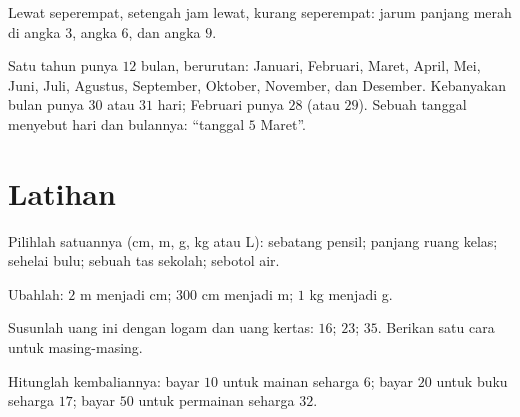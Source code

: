 \begin{omfigure}

{\small Lewat seperempat, setengah jam lewat, kurang seperempat:
jarum panjang merah di angka $3$, angka $6$, dan angka $9$.}
\end{omfigure}

\begin{example}[Kalender]\label{ex:g2:measure:calendar}
Satu tahun punya $12$ bulan, berurutan: Januari, Februari, Maret,
April, Mei, Juni, Juli, Agustus, September, Oktober, November, dan
Desember. Kebanyakan bulan punya $30$ atau $31$ hari; Februari punya
$28$ (atau $29$). Sebuah tanggal menyebut hari dan bulannya:
``tanggal $5$ Maret''.
\end{example}

\section{Latihan}

\begin{exercise}[$\star$]\label{exo:g2:measure:1}
Pilihlah satuannya (cm, m, g, kg atau L): sebatang pensil; panjang
ruang kelas; sehelai bulu; sebuah tas sekolah; sebotol air.
\end{exercise}

\begin{exercise}[$\star$]\label{exo:g2:measure:2}
Ubahlah: $2$ m menjadi cm; $300$ cm menjadi m; $1$ kg menjadi g.
\end{exercise}

\begin{exercise}[$\star$]\label{exo:g2:measure:3}
Susunlah  uang ini dengan logam dan uang kertas: $16$; \quad
$23$; \quad $35$. Berikan satu cara untuk masing-masing.
\end{exercise}

\begin{exercise}[$\star$]\label{exo:g2:measure:4}
Hitunglah kembaliannya: bayar $10$ untuk mainan seharga $6$; bayar
$20$ untuk buku seharga $17$; bayar $50$ untuk permainan seharga $32$.
\end{exercise}

